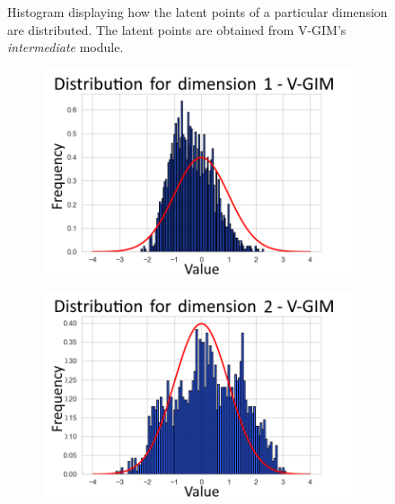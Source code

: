 \begin{figure}[h]
\begin{subfigure}[b]{0.25\textwidth}
	\end{subfigure}
	\caption{Histogram displaying how the latent points of a particular dimension are distributed. The latent points are obtained from V-GIM's \textit{intermediate} module.}
	\label{fig:distr_module1_beta0035}
\end{figure}
\begin{figure}[h]
	\centering
	\begin{subfigure}[b]{0.25\textwidth}
		\centering
		\includegraphics[width=1\linewidth]{"graphs/distr/module2 kld0035/_ distribution_latent_space_GIM_dim=0"}
	\end{subfigure}
	\hfill
	\begin{subfigure}[b]{0.25\textwidth}
		\centering
		\includegraphics[width=1\linewidth]{"graphs/distr/module2 kld0035/_ distribution_latent_space_GIM_dim=1"}
	\end{subfigure}
	\hfill
	\begin{subfigure}[b]{0.25\textwidth}

\end{subfigure}
\end{figure}
